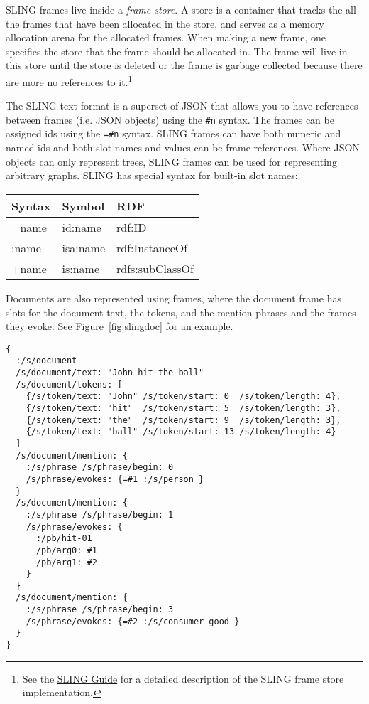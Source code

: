 \documentclass[11pt,a4paper]{article}
\begin{document}
SLING frames live inside a \emph{frame store}. A store is a container that
tracks the all the frames that have been allocated in the store, and serves as a
memory allocation arena for the allocated frames. When making a new frame, one
specifies the store that the frame should be allocated in. The frame will live in
this store until the store is deleted or the frame is garbage collected because
there are more no references to it.\footnote{See the \href{https://github.com/google/sling/blob/master/frame/README.md}{SLING Guide}
for a detailed description of the SLING frame store implementation.}

The SLING text format is a superset of JSON that allows you to have references
between frames (i.e. JSON objects) using the {\tt \#n} syntax. The frames can be
assigned ids using the {\tt=\#n} syntax. SLING frames can have both numeric and
named ids and both slot names and values can be frame references. Where JSON
objects can only represent trees, SLING frames can be used for representing
arbitrary graphs. SLING has special syntax for built-in slot names:

\begin{table}[h!]
\begin{tabular}{|l|l|l|}
\hline
Syntax & Symbol & RDF \\
\hline
=name & id:name & rdf:ID \\
:name & isa:name & rdf:InstanceOf \\
+name & is:name & rdfs:subClassOf \\
\hline
\end{tabular}
\end{table}

Documents are also represented using frames, where the document frame has slots
for the document text, the tokens, and the mention phrases and the frames they
evoke. See Figure~\ref{fig:slingdoc} for an example.

\begin{figure*}[t]
  \begin{verbatim}
{
  :/s/document
  /s/document/text: "John hit the ball"
  /s/document/tokens: [
    {/s/token/text: "John" /s/token/start: 0  /s/token/length: 4},
    {/s/token/text: "hit"  /s/token/start: 5  /s/token/length: 3},
    {/s/token/text: "the"  /s/token/start: 9  /s/token/length: 3},
    {/s/token/text: "ball" /s/token/start: 13 /s/token/length: 4}
  ]
  /s/document/mention: {
    :/s/phrase /s/phrase/begin: 0
    /s/phrase/evokes: {=#1 :/s/person }
  }
  /s/document/mention: {
    :/s/phrase /s/phrase/begin: 1
    /s/phrase/evokes: {
      :/pb/hit-01
      /pb/arg0: #1
      /pb/arg1: #2
    }
  }
  /s/document/mention: {
    :/s/phrase /s/phrase/begin: 3
    /s/phrase/evokes: {=#2 :/s/consumer_good }
  }
}
\end{verbatim}
  \caption{The text ``John hit the ball" in SLING frame notation. The document
  itself is represented by a frame that has the text, an array of tokens and
  the mentions that evoke frames. There are three frames: a person frame (John),
  a consumer good frame (bat) and a hit-01 frame. The hit frame has the person
  frame as the agent (arg0) and the ball frame as the object (arg1).}
  \label{fig:slingdoc}
\end{figure*}
\end{document}
